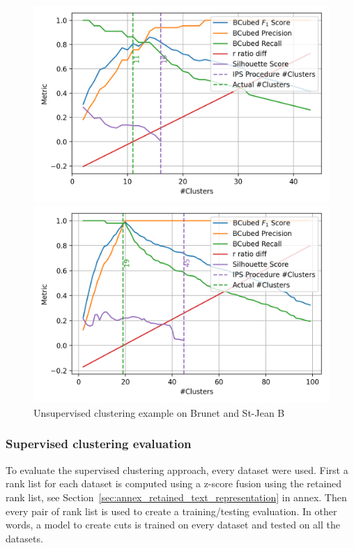 \begin{figure}
  \caption{Unsupervised clustering example on Brunet and St-Jean B}
  \label{fig:unsupervised_clustering}

  \label{fig:unsupervised_clustering_brunet}
  \includegraphics[width=\linewidth]{img/unsupervised_clustering_brunet.png}

  \label{fig:unsupervised_clustering_st_jean_B}
  \includegraphics[width=\linewidth]{img/unsupervised_clustering_st_jean_B.png}
\end{figure}

\subsubsection{Supervised clustering evaluation}

To evaluate the supervised clustering approach, every dataset were used.
First a rank list for each dataset is computed using a z-score fusion using the retained rank list, see Section~\ref{sec:annex_retained_text_representation} in annex.
Then every pair of rank list is used to create a training/testing evaluation.
In other words, a model to create cuts is trained on every dataset and tested on all the datasets.

